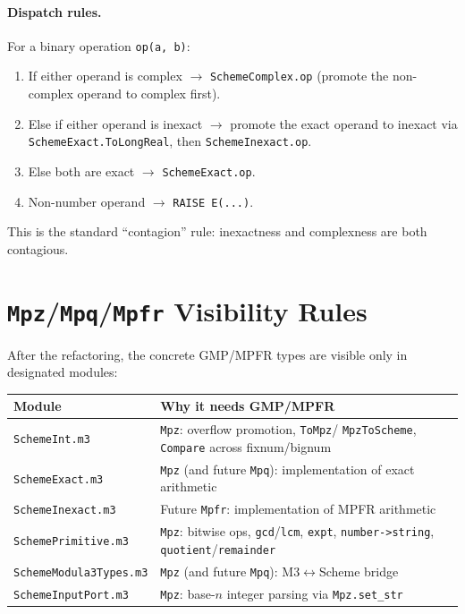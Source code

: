 \documentclass[12pt]{article}
\begin{document}
\paragraph{Dispatch rules.}
For a binary operation {\tt op(a, b)}:
\begin{enumerate}[nosep]
\item If either operand is complex $\to$ {\tt SchemeComplex.op}
  (promote the non-complex operand to complex first).
\item Else if either operand is inexact $\to$ promote the exact
  operand to inexact via {\tt SchemeExact.ToLongReal},
  then {\tt SchemeInexact.op}.
\item Else both are exact $\to$ {\tt SchemeExact.op}.
\item Non-number operand $\to$ {\tt RAISE E(...)}.
\end{enumerate}

\noindent This is the standard ``contagion'' rule: inexactness
and complexness are both contagious.

\section{{\tt Mpz}/{\tt Mpq}/{\tt Mpfr} Visibility Rules}
\label{sec:visibility}

After the refactoring, the concrete GMP/MPFR types are visible
only in designated modules:

\begin{center}
\begin{tabular}{lp{7cm}}
\toprule
\textbf{Module} & \textbf{Why it needs GMP/MPFR} \\
\midrule
{\tt SchemeInt.m3} & {\tt Mpz}: overflow promotion, {\tt ToMpz}/
  {\tt MpzToScheme}, {\tt Compare} across fixnum/bignum \\
{\tt SchemeExact.m3} & {\tt Mpz} (and future {\tt Mpq}):
  implementation of exact arithmetic \\
{\tt SchemeInexact.m3} & Future {\tt Mpfr}: implementation of
  MPFR arithmetic \\
{\tt SchemePrimitive.m3} & {\tt Mpz}: bitwise ops, {\tt gcd}/{\tt lcm},
  {\tt expt}, {\tt number->string}, {\tt quotient}/{\tt remainder} \\
{\tt SchemeModula3Types.m3} & {\tt Mpz} (and future {\tt Mpq}):
  M3$\leftrightarrow$Scheme bridge \\
{\tt SchemeInputPort.m3} & {\tt Mpz}: base-$n$ integer parsing
  via {\tt Mpz.set\_str} \\
\bottomrule
\end{tabular}
\end{center}
\end{document}
